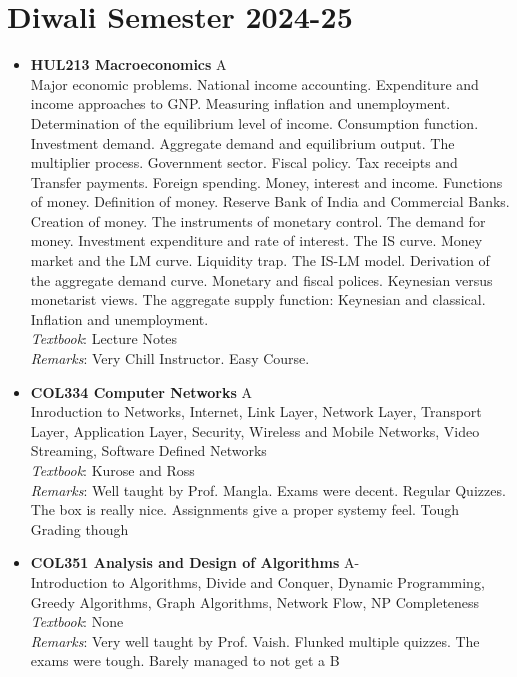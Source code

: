 \documentclass[a4paper]{article}
\begin{document}
\section*{Diwali Semester 2024-25}
\begin{itemize}
\item \textbf{HUL213 Macroeconomics} {\color{red}A}
    \\
    Major economic problems. National income accounting. Expenditure 
    and income approaches to GNP. Measuring inflation and unemployment. 
    Determination of the equilibrium level of income. Consumption 
    function. Investment demand. Aggregate demand and equilibrium 
    output. The multiplier process. Government sector. Fiscal policy. Tax 
    receipts and Transfer payments. Foreign spending. Money, interest 
    and income. Functions of money. Definition of money. Reserve Bank 
    of India and Commercial Banks. Creation of money. The instruments 
    of monetary control. The demand for money. Investment expenditure 
    and rate of interest. The IS curve. Money market and the LM curve. 
    Liquidity trap. The IS-LM model. Derivation of the aggregate demand 
    curve. Monetary and fiscal polices. Keynesian versus monetarist views. 
    The aggregate supply function: Keynesian and classical. Inflation and 
    unemployment.
    \\
    \textit{Textbook}: Lecture Notes
    \\
    \textit{Remarks}: Very Chill Instructor. Easy Course.
    

\item \textbf{COL334 Computer Networks} {\color{red} A}
    \\
    Inroduction to Networks, Internet, Link Layer, Network Layer, Transport Layer, Application Layer, Security, Wireless and Mobile Networks, Video Streaming, Software Defined Networks
    \\
    \textit{Textbook}: Kurose and Ross
    \\
    \textit{Remarks}: Well taught by Prof. Mangla. Exams were decent. Regular Quizzes. The box is really nice. Assignments give a proper systemy feel. Tough Grading though

\item \textbf{COL351 Analysis and Design of Algorithms} {\color{red}A-}
    \\
    Introduction to Algorithms, Divide and Conquer, Dynamic Programming, Greedy Algorithms, Graph Algorithms, Network Flow, NP Completeness
    \\
    \textit{Textbook}: None
    \\
    \textit{Remarks}: Very well taught by Prof. Vaish. Flunked multiple quizzes. The exams were tough. Barely managed to not get a B


\end{itemize}
\end{document}

